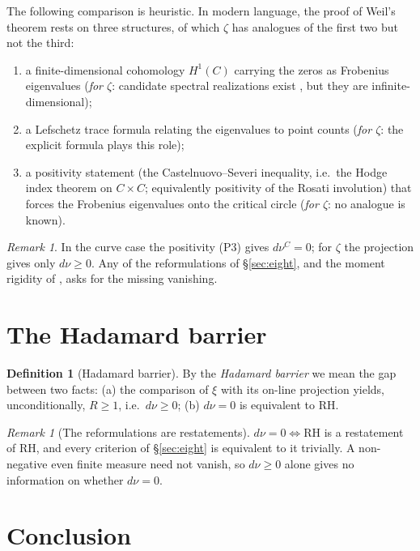 \documentclass[11pt]{amsart}
\theoremstyle{definition}
\newtheorem{definition}[theorem]{Definition}
\theoremstyle{remark}
\newtheorem{remark}[theorem]{Remark}
\newcommand{\RH}{\mathrm{RH}}
\newcommand{\dnu}{d\nu}
\begin{document}
The following comparison is heuristic. In modern language, the proof of Weil's theorem rests on three structures, of which $\zeta$
has analogues of the first two but not the third:
\begin{enumerate}[(P1)]
\item a finite-dimensional cohomology $H^1(C)$ carrying the zeros as Frobenius eigenvalues
(\emph{for $\zeta$}: candidate spectral realizations exist \cite{bgConnes99,CCM}, but they are
infinite-dimensional);
\item a Lefschetz trace formula relating the eigenvalues to point counts (\emph{for $\zeta$}: the
explicit formula plays this role);
\item a positivity statement (the Castelnuovo--Severi inequality, i.e.\ the Hodge index theorem
on $C\times C$; equivalently positivity of the Rosati involution) that forces
the Frobenius eigenvalues onto the critical circle (\emph{for $\zeta$}: no analogue is known).
\end{enumerate}

\begin{remark}
In the curve case the positivity (P3) gives $\dnu^C=0$; for $\zeta$ the projection gives only
$\dnu\ge0$. Any of the reformulations of \S\ref{sec:eight}, and the moment rigidity of
\cite{MomentRigidity}, asks for the missing vanishing.
\end{remark}

\section{The Hadamard barrier}\label{sec:barrier}

\begin{definition}[Hadamard barrier]\label{def:barrier}
By the \emph{Hadamard barrier} we mean the gap between two facts: (a) the comparison of $\xi$
with its on-line projection yields, unconditionally, $R\ge1$, i.e.\ $\dnu\ge0$; (b) $\dnu=0$ is
equivalent to $\RH$.
\end{definition}

\begin{remark}[The reformulations are restatements]\label{prop:barrier}
$\dnu=0\iff\RH$ is a restatement of $\RH$, and every criterion of \S\ref{sec:eight} is
equivalent to it trivially. A non-negative even finite measure need not vanish, so $\dnu\ge0$
alone gives no information on whether $\dnu=0$.
\end{remark}

\section{Conclusion}
\end{document}
